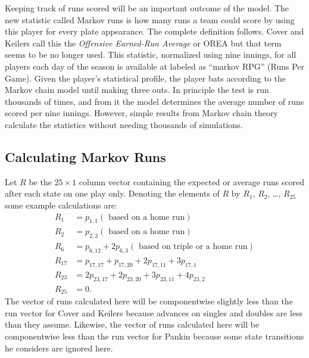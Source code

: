 \documentclass[12pt]{article}
\begin{document}
Keeping track of runs scored will be an important outcome of the model.
The new statistic called Markov runs%
%
is how many runs a team could score by using this player for every plate
appearance.  The complete definition follows. Cover and Keilers
\cite{cover77} call this the \emph{Offensive Earned-Run Average} or OREA
but that term seems to be no longer used.  This statistic, normalized
using nine innings, for all players each day of the season is available
at  labeled as ``markov RPG'' (Runs Per Game). Given the
player's statistical profile, the player bats according to the Markov
chain model until making three outs.  In principle the test is run
thousands of times, and from it the model determines the average number
of runs scored per nine innings.  However, simple results from Markov
chain theory calculate the statistics without needing thousands of
simulations.

\subsection*{Calculating Markov Runs} Let \( R \) be the \( 25 \times 1 \)
column vector containing the expected or average runs scored after each
state on one play only. Denoting the elements of \( R \) by \( R_{1} \),
\( R_{2} \), \dots, \( R_{25} \) some example calculations are:
\begin{align*}
    R_{1}       &= p_{1,1} (\text{ based on a home run}) \\
    R_{2}       &= p_{2,2} (\text{ based on a home run}) \\
    R_{6}       &= p_{6,12} + 2p_{6,3} (\text{ based on triple or a home
    run}) \\
    R_{17}      &= p_{17,17} + p_{17,20} + 2p_{17,11} + 3p_{17,1} \\
    R_{23}      &= 2p_{23,17} + 2p_{23,20} + 3p_{23,11} + 4p_{23,2} \\
    R_{25}      &= 0.
\end{align*}
The vector of runs calculated here will be componentwise slightly less
than the run vector for Cover and Keilers because advances on singles
and doubles are less than they assume.  Likewise, the vector of runs
calculated here will be componentwise less than the run vector for
Pankin because some state transitions he considers are ignored here.
\end{document}
